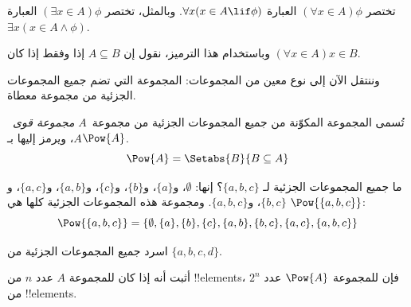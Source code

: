 \documentclass[../../../include/open-logic-section]{subfiles}
\begin{document}
\begin{defn}
تختصر $(\forall x \in A)\phi$ العبارة $\forall x(x \in A \lif
\phi)$. وبالمثل، تختصر $(\exists x \in A)\phi$ العبارة $\exists x(x
\in A \land \phi)$.
\end{defn}

وباستخدام هذا الترميز، نقول إن $A \subseteq B$ إذا وفقط إذا كان $(\forall
x \in A)x \in B$.

وننتقل الآن إلى نوع معين من المجموعات: المجموعة التي تضم جميع
المجموعات الجزئية من مجموعة معطاة.

\begin{defn}
تُسمى المجموعة المكوّنة من جميع المجموعات الجزئية من مجموعة~$A$
\emph{مجموعة قوى}~$A$، ويرمز إليها بـ$\Pow{A}$.
  \[
    \Pow{A} = \Setabs{B}{B \subseteq A}
  \]
\end{defn}

\begin{ex}
ما جميع المجموعات الجزئية لـ $\{ a, b, c \}$؟ إنها:
$\emptyset$، و$\{a \}$، و$\{b\}$، و$\{c\}$، و$\{a, b\}$، و$\{a, c\}$، و$\{b,
c\}$، و$\{a, b, c\}$. ومجموعة هذه المجموعات الجزئية كلها هي
$\Pow{\{a,b,c\}}$:
\[
\Pow{\{ a, b, c \}} = \{\emptyset, \{a \}, \{b\}, \{c\}, \{a, b\},
\{b, c\}, \{a, c\}, \{a, b, c\}\}
\]
\end{ex}

\begin{prob}
اسرد جميع المجموعات الجزئية من $\{a, b, c, d\}$.
\end{prob}

\begin{prob}
أثبت أنه إذا كان للمجموعة $A$ عدد $n$ من !!{element}s، فإن للمجموعة $\Pow{A}$ عدد $2^n$
من !!{element}s.
\end{prob}
\end{document}
